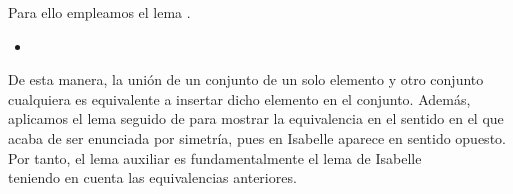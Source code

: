 \begin{isabellebody}
\begin{isamarkuptext}
  Para ello empleamos el lema .

  \begin{itemize}
    \item[]  \hspace{5cm} 
  \end{itemize}

  De esta manera, la unión de un conjunto de un solo elemento y otro 
  conjunto cualquiera es equivalente a insertar dicho elemento en el 
  conjunto. Además, aplicamos el lema seguido de  para 
  mostrar la equivalencia en el sentido en el que acaba de ser
  enunciada por simetría, pues en Isabelle aparece en sentido opuesto.
  Por tanto, el lema auxiliar  es fundamentalmente el
  lema de Isabelle\\  teniendo en cuenta las
  equivalencias anteriores.


\end{isamarkuptext}
\end{isabellebody}
